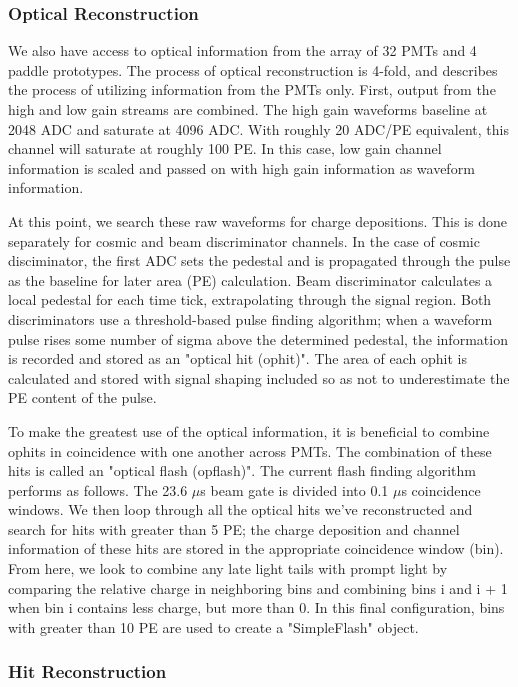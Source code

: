 \documentclass[12pt]{article}
\begin{document}
\subsubsection{Optical Reconstruction} 
We also have access to optical information from the array of 32 PMTs and 4 paddle prototypes. The process of optical reconstruction is 4-fold, and describes the process of utilizing information from the PMTs only.  First, output from the high and low gain streams are combined.  The high gain waveforms baseline at 2048 ADC and saturate at 4096 ADC.  With roughly 20 ADC/PE equivalent, this channel will saturate at roughly 100 PE.  In this case, low gain channel information is scaled and passed on with high gain information as waveform information. 
\par At this point, we search these raw waveforms for charge depositions.  This is done separately for cosmic and beam discriminator channels. In the case of cosmic disciminator, the first ADC sets the pedestal and is propagated through the pulse as the baseline for later area (PE) calculation. Beam discriminator calculates a local pedestal for each time tick, extrapolating through the signal region. Both discriminators use a threshold-based pulse finding algorithm; when a waveform pulse rises some number of sigma above the determined pedestal, the information is recorded and stored as an "optical hit (ophit)".  The area of each ophit is calculated and stored with signal shaping included so as not to underestimate the PE content of the pulse.
\par To make the greatest use of the optical information, it is beneficial to combine ophits in coincidence with one another across PMTs.  The combination of these hits is called an "optical flash (opflash)".  The current flash finding algorithm performs as follows. The 23.6 $\mu$s beam gate is divided into 0.1 $\mu$s coincidence windows. We then loop through all the optical hits we've reconstructed and search for hits with greater than 5 PE; the charge deposition and channel information of these hits are stored in the appropriate coincidence window (bin).  From here, we look to combine any late light tails with prompt light by comparing the relative charge in neighboring bins and combining bins i and i + 1 when bin i contains less charge, but more than 0.  In this final configuration, bins with greater than 10 PE are used to create a "SimpleFlash" object.
\subsubsection{Hit Reconstruction}
\end{document}
